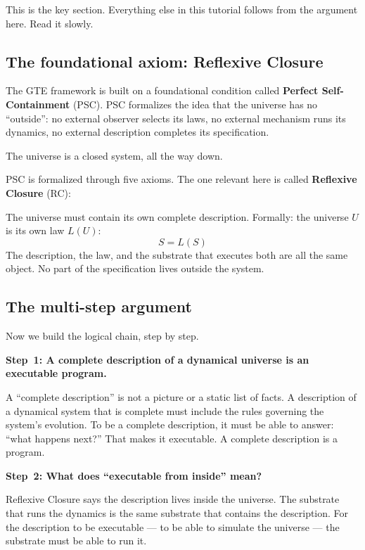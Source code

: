 \documentclass[11pt,a4paper]{article}
\newcommand{\term}[1]{\textbf{#1}}
\begin{document}
This is the key section.  Everything else in this tutorial follows from the argument
here.  Read it slowly.

\subsection{The foundational axiom: Reflexive Closure}

The GTE framework is built on a foundational condition called
\term{Perfect Self-Containment} (PSC).  PSC formalizes the idea that the universe has
no ``outside'': no external observer selects its laws, no external mechanism runs its
dynamics, no external description completes its specification.

The universe is a closed system, all the way down.

PSC is formalized through five axioms.  The one relevant here is called
\term{Reflexive Closure} (RC):

\begin{tcolorbox}[colback=boxblue,colframe=blue!40!black,title=Reflexive Closure (RC)]
The universe must contain its own complete description.  Formally: the universe $U$
is its own law $L(U)$: 
\[
  S = L(S)
\]
The description, the law, and the substrate that executes both are all the same object.
No part of the specification lives outside the system.
\end{tcolorbox}

\subsection{The multi-step argument}

Now we build the logical chain, step by step.

\medskip
\textbf{Step~1: A complete description of a dynamical universe is an executable program.}

A ``complete description'' is not a picture or a static list of facts.  A description of
a dynamical system that is complete must include the rules governing the system's
evolution.  To be a complete description, it must be able to answer: ``what happens
next?''  That makes it executable.  A complete description is a program.

\medskip
\textbf{Step~2: What does ``executable from inside'' mean?}

Reflexive Closure says the description lives inside the universe.  The substrate that
runs the dynamics is the same substrate that contains the description.  For the
description to be executable — to be able to simulate the universe — the substrate
must be able to run it.
\end{document}
